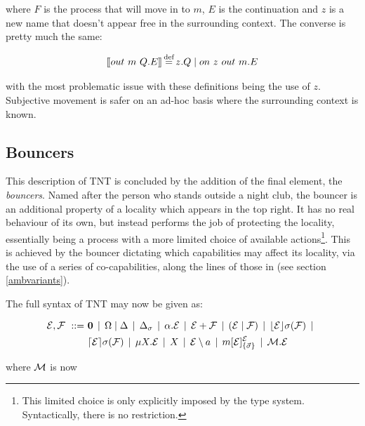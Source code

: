\noindent where $F$ is the process that will move in to $m$, $E$ is
the continuation and $z$ is a new name that doesn't appear free in the
surrounding context.  The converse is pretty much the same:

\begin{equation}
[\hspace{-0.3ex}[ out\ m\ Q.E ]\hspace{-0.3ex}] \operatorname{\stackrel{\textrm{def}}{=}} z.Q \;|\; on\ z\ out\ m.E
\end{equation}

\noindent with the most problematic issue with these definitions being
the use of $z$.  Subjective movement is safer on an ad-hoc basis where
the surrounding context is known.

\subsection{Bouncers}
\label{bouncers}

This description of TNT is concluded by the addition of the final
element, the \emph{bouncers}.  Named after the person who stands outside
a night club, the bouncer is an additional property of a locality which
appears in the top right.  It has no real behaviour of its own, but
instead performs the job of protecting the locality, essentially being a
process with a more limited choice of available actions\footnote{This
limited choice is only explicitly imposed by the type system.
Syntactically, there is no restriction.}.  This is achieved by the
bouncer dictating which capabilities may affect its locality, via the
use of a series of co-capabilities, along the lines of those in
\cite{sangiorgi:mobsafeambients} (see section \ref{ambvariants}).

The full syntax of TNT may now be given as:

\begin{equation}
  \begin{aligned}
    \text{$\mathcal{E}$}, \text{$\mathcal{F}$} \ ::=\ &
    \textbf{0}  \;\,|\,\; 
    \Omega \;|\;
    \Delta \;\,|\,\; 
    \Delta_{\sigma} \;\,|\,\; 
    \alpha . \text{$\mathcal{E}$}  \;\,|\,\;
    \text{$\mathcal{E}$} + \text{$\mathcal{F}$} \;\,|\,\; 
    (\text{$\mathcal{E}$}\;|\;\text{$\mathcal{F}$})\;\,|\,\; 
    \lfloor{\text{$\mathcal{E}$}}\rfloor {\sigma} ({\text{$\mathcal{F}$}}) \;\,|\,\; \\
    & \lceil{\text{$\mathcal{E}$}}\rceil {\sigma} ({\text{$\mathcal{F}$}}) \;\,|\,\; 
    \mu X . \text{$\mathcal{E}$} \;\,|\,\; 
    X \;\,|\,\; 
    \text{$\mathcal{E}$} \setminus a \;\,|\,\; 
    {m}[ \text{$\mathcal{E}$} ]^{\text{$\mathcal{E}$}}_{\{\vec{\sigma}\}} \;\,|\,\;
    \text{$\mathcal{M}$} . \text{$\mathcal{E}$}
  \end{aligned}
\end{equation}

\noindent where $\text{$\mathcal{M}$}$ is now

